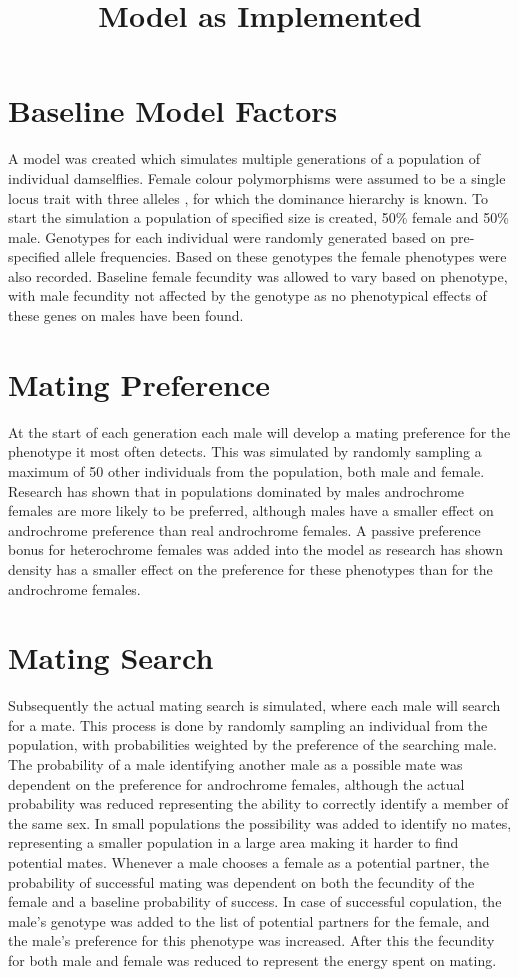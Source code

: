 \documentclass{article}
\title{Model as Implemented}
\date{\vspace{-5ex}}
\begin{document}
\maketitle

\section{Baseline Model Factors}
A model was created which simulates multiple generations of a population of individual damselflies. Female colour polymorphisms were assumed to be a single locus trait with three alleles \cite{}, for which the dominance hierarchy is known. To start the simulation a population of specified size is created, 50\% female and 50\% male. Genotypes for each individual were randomly generated based on pre-specified allele frequencies. Based on these genotypes the female phenotypes were also recorded. Baseline female fecundity was allowed to vary based on phenotype, with male fecundity not affected by the genotype as no phenotypical effects of these genes on males have been found.

\section{Mating Preference}

At the start of each generation each male will develop a mating preference for the phenotype it most often detects. This was simulated by randomly sampling a maximum of 50 other individuals from the population, both male and female. Research has shown that in populations dominated by males androchrome females are more likely to be preferred, although males have a smaller effect on androchrome preference than real androchrome females. A passive preference bonus for heterochrome females was added into the model as research has shown density has a smaller effect on the preference for these phenotypes than for the androchrome females.

\section{Mating Search}
Subsequently the actual mating search is simulated, where each male will search for a mate. This process is done by randomly sampling an individual from the population, with probabilities weighted by the preference of the searching male. The probability of a male identifying another male as a possible mate was dependent on the preference for androchrome females, although the actual probability was reduced representing the ability to correctly identify a member of the same sex. In small populations the possibility was added to identify no mates, representing a smaller population in a large area making it harder to find potential mates. Whenever a male chooses a female as a potential partner, the probability of successful mating was dependent on both the fecundity of the female and a baseline probability of success. In case of successful copulation, the male's genotype was added to the list of potential partners for the female, and the male's preference for this phenotype was increased. After this the fecundity for both male and female was reduced to represent the energy spent on mating.
\end{document}

